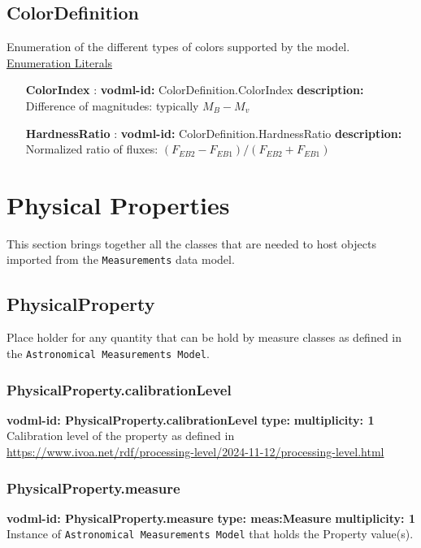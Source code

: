   \subsection{ColorDefinition}
    \label{sect:ColorDefinition}
    Enumeration of the different types of colors supported by the model.
    \noindent \underline{Enumeration Literals}
    \vspace{-\parsep}
    \small
    \begin{itemize}
    \item[\textbf{ColorIndex}]: \textbf{vodml-id:} ColorDefinition.ColorIndex \newline
    \textbf{description:} Difference of magnitudes: typically $M_B - M_v$
    \item[\textbf{HardnessRatio}]: \textbf{vodml-id:} ColorDefinition.HardnessRatio \newline
    \textbf{description:} Normalized ratio of fluxes: $(F_{EB2} - F_{EB1}) / (F_{EB2} + F_{EB1})$
    \end{itemize}
    \normalsize

\section{Physical Properties}
This section brings together all the classes that are needed to 
host objects imported from the \texttt{Measurements} data model. 
  \subsection{PhysicalProperty}
    \label{sect:PhysicalProperty}
    Place holder for any quantity that can be hold by measure classes as defined in the \texttt{Astronomical Measurements Model}.

    \subsubsection{PhysicalProperty.calibrationLevel}
    \textbf{vodml-id: PhysicalProperty.calibrationLevel} \newline
    \textbf{type: } \newline
    \textbf{multiplicity: 1} \newline
    Calibration level of the property as defined in \url{https://www.ivoa.net/rdf/processing-level/2024-11-12/processing-level.html}

    \subsubsection{PhysicalProperty.measure}
    \textbf{vodml-id: PhysicalProperty.measure} \newline
    \textbf{type: meas:Measure} \newline
    \textbf{multiplicity: 1} \newline
    Instance of \texttt{Astronomical Measurements Model} that holds the Property value(s).

